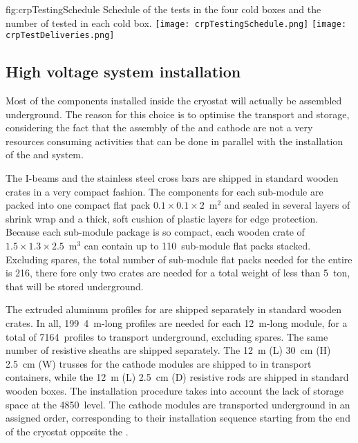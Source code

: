 \begin{dunefigure}{fig:crpTestingSchedule}
{Schedule of the  tests in the four cold boxes and the number of  tested in each cold box.}
\texttt{[image: crpTestingSchedule.png]}
\texttt{[image: crpTestDeliveries.png]}
\end{dunefigure}


\subsection{High voltage system installation}
Most of the  components installed inside the cryostat will actually be assembled underground.
The reason for this choice is to optimise the transport and storage, considering the fact that the assembly of the  and cathode are not a very resources consuming activities that can be done in parallel with the installation of the  and  system.

The   I-beams and the stainless steel cross bars are shipped in standard wooden crates in a very compact fashion.
The components for each  sub-module are packed into one compact flat pack $0.1 \times 0.1 \times 2$~m$^2$ and sealed in several layers of shrink wrap and a thick, soft cushion of plastic layers for edge protection.
Because each sub-module package is so compact, each wooden crate of $1.5 \times 1.3 \times 2.5$~m$^3$ can contain up to 110~sub-module flat packs stacked.
Excluding spares, the total number of sub-module flat packs needed for the entire  is 216, there fore only two crates are needed for a total weight of less than 5~ton, that will be stored underground.

The extruded aluminum profiles for  are shipped separately in standard wooden crates.
In all, 199~4~m-long profiles are needed for each 12~m-long  module, for a total of 7164~profiles to transport underground, excluding spares.
The same number of resistive sheaths are shipped separately.
The 12~m (L) 30~cm (H) 2.5~cm (W) trusses for the cathode modules are shipped to  in transport containers, while the 12~m (L) 2.5~cm (D) resistive rods are shipped in standard wooden boxes.
The installation procedure takes into account the lack of storage space at the 4850~level.
The cathode modules are transported underground in an assigned order, corresponding to their installation sequence starting from the end of the cryostat opposite the .

